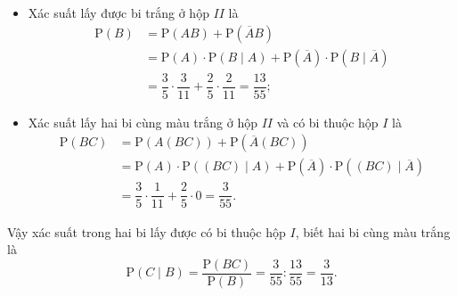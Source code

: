 \begin{ex}
{\begin{itemize}
			\item Xác suất lấy được bi trắng ở hộp $II$ là
			\begin{align*}
				\mathrm{P}(B)&=\mathrm{P}\left(AB\right)+\mathrm{P}\left(\overline{A}B\right)\\
				&=\mathrm{P}(A)\cdot \mathrm{P}\left(B \mid A\right)+\mathrm{P}\left(\overline{A}\right)\cdot \mathrm{P}\left(B \mid \overline{A}\right)\\
				&=\dfrac{3}{5}\cdot \dfrac{3}{11}+\dfrac{2}{5}\cdot \dfrac{2}{11}=\dfrac{13}{55};
			\end{align*}
			\item Xác suất lấy hai bi cùng màu trắng ở hộp $II$ và có bi thuộc hộp $I$ là
			\begin{align*}
				\mathrm{P}(BC)&=\mathrm{P}\left(A(BC)\right)+\mathrm{P}\left(\overline{A}(BC)\right)\\
				&=\mathrm{P}(A)\cdot \mathrm{P}\left((BC) \mid A\right)+\mathrm{P}\left(\overline{A}\right)\cdot \mathrm{P}\left((BC) \mid \overline{A}\right)\\
				&=\dfrac{3}{5}\cdot \dfrac{1}{11}+\dfrac{2}{5}\cdot 0=\dfrac{3}{55}.
			\end{align*}
		\end{itemize}
		Vậy xác suất trong hai bi lấy được có bi thuộc hộp $I$, biết hai bi cùng màu trắng là
		$$ \mathrm{P}\left(C\mid B\right)=\dfrac{\mathrm{P}(BC)}{\mathrm{P}(B)}=\dfrac{3}{55}:\dfrac{13}{55}= \dfrac{3}{13}.$$
	} 
	
\end{ex}
